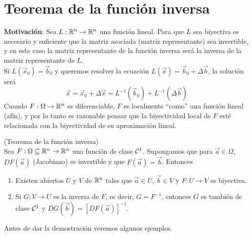 \section{Teorema de la funci\'on inversa} 

\textbf{Motivaci\'on}: Sea $L:\mathbb{R}^n\to \mathbb{R}^n$ una funci\'on lineal. Para que $L$ sea biyectiva es necesario y suficiente que la matriz asociada (matriz representante) sea invertible, y en este caso la matriz representante de la funci\'on inversa ser\'a la inversa de la matriz representante de $L$.\\ Si $L(\vec{x}_0)=\vec{b}_0$ y queremos resolver la ecuaci\'on $L(\vec{x})=\vec{b}_0+\Delta \vec{b}$, la soluci\'on ser\'a $$\vec{x}=\vec{x}_0+\Delta \vec{x}=L^{-1}(\vec{b}_0)+L^{-1}(\Delta \vec{b})$$ Cuando $F:\Omega\to \mathbb{R}^n$ es diferenciable, $F$ es localmente ``como'' una funci\'on lineal (af\'in), y por lo tanto es razonable pensar que la biyectividad local de $F$ est\'e relacionada con la biyectividad de su aproximaci\'on lineal.

\begin{teorema}{\rm (Teorema de la funci\'on inversa) }\label{teofuncioninversa}
\\Sea $F:\Omega\subseteq\mathbb{R}^n \to \mathbb{R}^n$ una funci\'on de clase ${\cal{C}}^1$. Supongamos que para $\vec{a}\in \Omega$, $DF(\vec{a})$ (Jacobiano) es invertible y que $F(\vec{a})=\vec{b}$. Entonces
\begin{enumerate}
\item Existen abiertos $U$ y $V$ de $\mathbb{R}^n$ tales que $\vec{a}\in U$, $\vec{b}\in V$ y $F:U\to V$ es biyectiva.
\item Si $G:V\to U$ es la inversa de $F$, es decir, $G=F^{-1}$, entonces $G$ es tambi\'en de clase ${\cal{C}}^1$ y $DG(\vec{b})=[DF(\vec{a})]^{-1}$.
\end{enumerate}
\end{teorema}

Antes de dar la demostraci\'on veremos algunos ejemplos.

